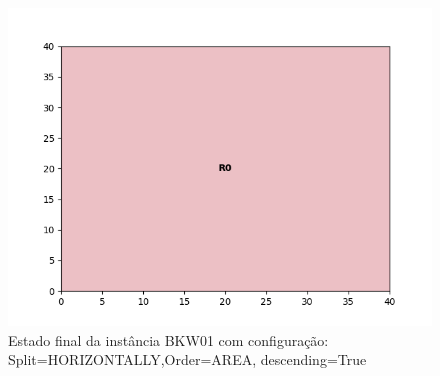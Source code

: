 \begin{figure}[H]
    \centering
    \caption[]{Estado final da instância BKW01 com configuração: Split=HORIZONTALLY,Order=AREA, descending=True}
    \label{fig:bkw01-horizontally-area-true}
    \includegraphics[scale=0.5]{output/figures/bkw/bkw01/horizontally/area/true/00}
\end{figure}